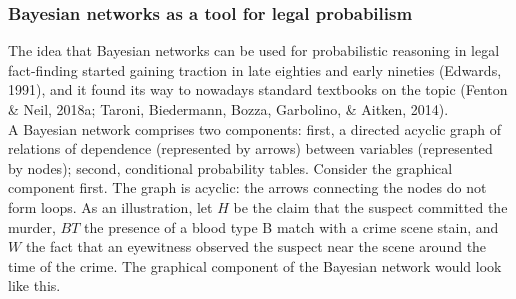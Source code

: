 \documentclass[11pt,dvipsnames,enabledeprecatedfontcommands]{scrartcl}
\begin{document}
\subsubsection{Bayesian networks as a tool for legal
probabilism}\label{bayesian-networks-as-a-tool-for-legal-probabilism}

The idea that Bayesian networks can be used for probabilistic reasoning
in legal fact-finding started gaining traction in late eighties and
early nineties (Edwards, 1991), and it found its way to nowadays
standard textbooks on the topic (Fenton \& Neil, 2018a; Taroni,
Biedermann, Bozza, Garbolino, \& Aitken, 2014).\\
A Bayesian network comprises two components: first, a directed acyclic
graph of relations of dependence (represented by arrows) between
variables (represented by nodes); second, conditional probability
tables. Consider the graphical component first. The graph is acyclic:
the arrows connecting the nodes do not form loops. As an illustration,
let \(H\) be the claim that the suspect committed the murder, \(BT\) the
presence of a blood type B match with a crime scene stain, and \(W\) the
fact that an eyewitness observed the suspect near the scene around the
time of the crime. The graphical component of the Bayesian network would
look like this.

\noindent
\end{document}
